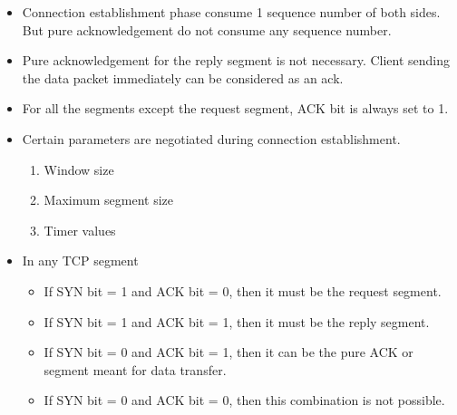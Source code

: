 \begin{itemize}\small
    \item Connection establishment phase consume 1 sequence number of both sides. But pure acknowledgement do not consume any sequence number. 
    \item Pure acknowledgement for the reply segment is not necessary. Client sending the data packet immediately can be considered as an ack. 
    \item For all the segments except the request segment, ACK bit is always set to 1.
    \item Certain parameters are negotiated during connection establishment. 
    \begin{enumerate}
        \item Window size
        \item Maximum segment size
        \item Timer values
    \end{enumerate}
    \item In any TCP segment
    \begin{itemize}\scriptsize
        \item If SYN bit = 1 and ACK bit = 0, then it must be the request
        segment.
        \item If SYN bit = 1 and ACK bit = 1, then it must be the reply segment.
        \item If SYN bit = 0 and ACK bit = 1, then it can be the pure ACK or segment meant for data transfer.
        \item If SYN bit = 0 and ACK bit = 0, then this combination is not possible.
    \end{itemize}
\end{itemize}